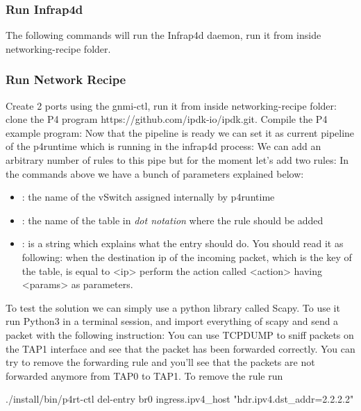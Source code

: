 \documentclass[../sn.tex]{subfiles}
\begin{document}
\subsubsection*{Run Infrap4d}
The following commands will run the Infrap4d daemon, run it from inside networking-recipe folder.

\subsubsection*{Run Network Recipe}
Create 2 ports using the gnmi-ctl, run it from inside networking-recipe folder:
clone the P4 program https://github.com/ipdk-io/ipdk.git. Compile the P4 example program:
Now that the pipeline is ready we can set it as current pipeline of the p4runtime which is running in the infrap4d process:
We can add an arbitrary number of rules to this pipe but for the moment let's add two rules:
In the commands above we have a bunch of parameters explained below:
\begin{itemize}
    \item {}: the name of the vSwitch assigned internally by p4runtime
    \item {}: the name of the table in \emph{dot notation} where the rule should be added
    \item {}: is a string which explains what the entry should do.
    You should read it as following: when the destination ip of the incoming packet, which is the key of the table, is equal to <ip> perform the action called <action> having <params> as parameters.
\end{itemize}
To test the solution we can simply use a python library called Scapy. To use it run Python3 in a terminal session, and import everything of scapy  and send a packet with the following instruction:
You can use TCPDUMP to sniff packets on the TAP1 interface and see that the packet has been forwarded correctly. You can try to remove the forwarding rule and you'll see that the packets are not forwarded anymore from TAP0 to TAP1. To remove the rule run 
\begin{center}
    ./install/bin/p4rt-ctl del-entry br0 ingress.ipv4\_host "hdr.ipv4.dst\_addr=2.2.2.2"
\end{center}
\clearpage
\end{document}
